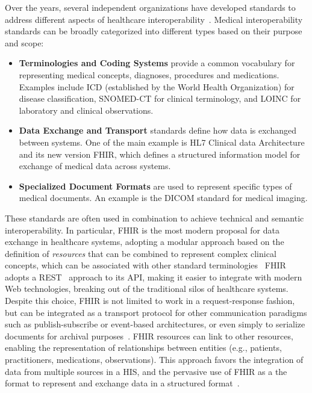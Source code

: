 Over the years, several independent organizations have developed standards to address different aspects of healthcare interoperability~\cite{benson2016principles}.
%
Medical interoperability standards can be broadly categorized into different types based on their purpose and scope: 
\begin{itemize}
    \item \textbf{Terminologies and Coding Systems} provide a common vocabulary for representing medical concepts, diagnoses, procedures and medications. Examples include \ac{ICD} (established by the World Health Organization) for disease classification, \ac{SNOMED-CT} for clinical terminology, and \ac{LOINC} for laboratory and clinical observations.
    \item \textbf{Data Exchange and Transport} standards define how data is exchanged between systems. One of the main example is \ac{HL7} Clinical data Architecture and its new version \ac{FHIR}, which defines a structured information model for exchange of medical data across systems.
    \item \textbf{Specialized Document Formats} are used to represent specific types of medical documents. An example is the \ac{DICOM} standard for medical imaging.
\end{itemize}

These standards are often used in combination to achieve technical and semantic interoperability. 
%
In particular, \ac{FHIR} is the most modern proposal for data exchange in healthcare systems, adopting a modular approach based on the definition of \emph{resources} that can be combined to represent complex clinical concepts, which can be associated with other standard terminologies~\cite{Braunstein_2018}
%
\ac{FHIR} adopts a \ac{REST}~\cite{fielding2000architectural} approach to its \ac{API}, making it easier to integrate with modern Web technologies, breaking out of the traditional silos of healthcare systems. 
%
Despite this choice, \ac{FHIR} is not limited to work in a request-response fashion, but can be integrated as a transport protocol for other communication paradigms such as publish-subscribe or event-based architectures, or even simply to serialize documents for archival purposes~\cite{benson2016principles}.
%
\ac{FHIR} resources can link to other resources, enabling the representation of relationships between entities (e.g., patients, practitioners, medications, observations). 
%
This approach favors the integration of data from multiple sources in a \ac{HIS}, and the pervasive use of \ac{FHIR} as a the format to represent and exchange data in a structured format~\cite{benson2016principles}.

